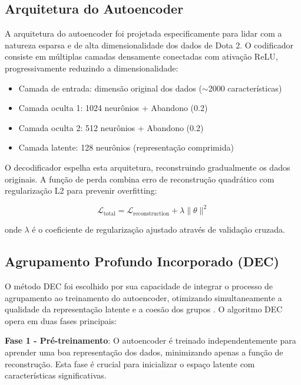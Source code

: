 \documentclass[12pt]{article}
\begin{document}
\subsection{Arquitetura do Autoencoder}

A arquitetura do autoencoder foi projetada especificamente para lidar com a natureza esparsa e de alta dimensionalidade dos dados de Dota 2. O codificador consiste em múltiplas camadas densamente conectadas com ativação ReLU, progressivamente reduzindo a dimensionalidade:

\begin{itemize}
    \item Camada de entrada: dimensão original dos dados ($\sim$2000 características)
    \item Camada oculta 1: 1024 neurônios + Abandono (0.2)
    \item Camada oculta 2: 512 neurônios + Abandono (0.2)
    \item Camada latente: 128 neurônios (representação comprimida)
\end{itemize}

O decodificador espelha esta arquitetura, reconstruindo gradualmente os dados originais. A função de perda combina erro de reconstrução quadrático com regularização L2 para prevenir overfitting:

\begin{equation}
\mathcal{L}_{\text{total}} = \mathcal{L}_{\text{reconstruction}} + \lambda\|\theta\|^2
\end{equation}

onde $\lambda$ é o coeficiente de regularização ajustado através de validação cruzada.

\subsection{Agrupamento Profundo Incorporado (DEC)}

O método DEC foi escolhido por sua capacidade de integrar o processo de agrupamento ao treinamento do autoencoder, otimizando simultaneamente a qualidade da representação latente e a coesão dos grupos \cite{xie2016unsupervised}. O algoritmo DEC opera em duas fases principais:

\textbf{Fase 1 - Pré-treinamento}: O autoencoder é treinado independentemente para aprender uma boa representação dos dados, minimizando apenas a função de reconstrução. Esta fase é crucial para inicializar o espaço latente com características significativas.
\end{document}
